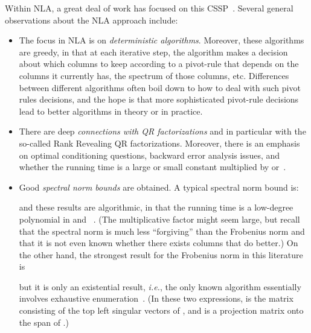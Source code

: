 \documentclass[twoside]{article}
\begin{document}
Within NLA, a great deal of work has focused on this 
CSSP~\cite{BG65,Fos86,Cha87,CH90,BH91,HP92,CI94,GE96,BQ98a,PT99,Pan00}.
Several general observations about the NLA approach include:
\begin{itemize}
\item
The focus in NLA is on \emph{deterministic algorithms}.
Moreover, these algorithms are greedy, in that at each iterative step, the 
algorithm makes a decision about which columns to keep according to a 
pivot-rule that depends on the columns it currently has, the spectrum of 
those columns, etc.
Differences between different algorithms often boil down to how to deal with 
such pivot rules decisions, and the hope is that more sophisticated 
pivot-rule decisions lead to better algorithms in theory or in practice.
\item
There are deep \emph{connections with QR factorizations} and in particular 
with the so-called Rank Revealing QR factorizations.
Moreover, there is an emphasis on optimal conditioning questions, backward 
error analysis issues, and whether the running time is a large or small 
constant multiplied by  or~.
\item
Good \emph{spectral norm bounds} are obtained.
A typical spectral norm bound is:

and these results are algorithmic, in that the running time is a low-degree 
polynomial in  and ~\cite{GE96}.
(The  multiplicative factor might seem large, but recall that 
the spectral norm is much less ``forgiving'' than the Frobenius norm and 
that it is not even known whether there exists columns that do better.)
On the other hand, the strongest result for the Frobenius norm in this 
literature is

but it is only an existential result, \emph{i.e.}, the only known algorithm 
essentially involves exhaustive enumeration~\cite{HP92}.
(In these two expressions,  is the  matrix consisting of the
top  left singular vectors of , and  is a projection matrix 
onto the span of .)
\end{itemize}
\end{document}
